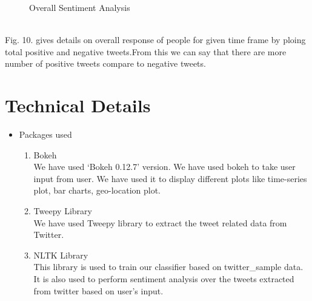 \documentclass[journal, a4paper]{IEEEtran}
\begin{document}
\begin{enumerate}
\begin{figure}[!hbt]
\begin{center}
		\caption{Overall Sentiment Analysis }		
		\label{fig:tf_plot}
		\end{center}
	\end{figure}
    \\Fig. 10. gives details on overall response of people for given time frame by ploing total positive and negative tweets.From this we can say that there are more number of positive tweets compare to negative tweets.  
\end{enumerate}

\section{Technical Details}
\begin{itemize}
  \item Packages used
  	\begin{enumerate}
 		 \item Bokeh\\ We have used ‘Bokeh 0.12.7’ version. We have used bokeh to take user input from user. We have used it to display different plots like time-series plot, bar charts, geo-location plot.
  		\item Tweepy Library\\ We have used Tweepy library to extract the tweet related data from Twitter.
        \item NLTK Library\\ This library is used to train our classifier based on twitter\_sample data. It is also used to perform sentiment analysis over the tweets extracted from twitter based on user’s input.


\end{enumerate}
\end{itemize}
\end{document}
